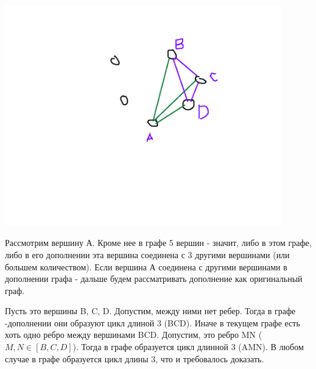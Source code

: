 \documentclass[a4paper]{article}
\begin{document}
\includegraphics[width=12cm]{1}



Рассмотрим вершину А. Кроме нее в графе 5 вершин - значит, либо в этом графе, либо в его дополнении эта вершина соединена с 3 другими вершинами (или большем количеством).
Если вершина А соединена с другими вершинами в дополнении графа - дальше будем рассматривать дополнение как оригинальный граф.

Пусть это вершины B, C, D. Допустим, между ними нет ребер. Тогда в графе -дополнении они образуют цикл длиной 3 (BCD). Иначе в текущем графе есть хоть одно ребро между вершинами BCD. Допустим, это ребро MN ( $M, N \in [B, C, D]$). Тогда в графе образуется цикл длинной 3 (AMN).
В любом случае в графе образуется цикл длины 3, что и требовалось доказать.
\end{document}
